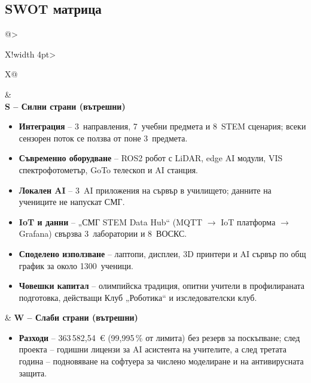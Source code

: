 \documentclass[11pt,a4paper]{article}
\renewcommand{\arraystretch}{1.15}
\newcommand{\NumTotal}{363\,582,54~€}
\newcommand{\PctUse}{99,995\,\%}
\begin{document}
\subsection{SWOT матрица}

\begingroup
\footnotesize
\setlength{\tabcolsep}{5pt}
\renewcommand{\arraystretch}{1.0}
\newcommand{\swothead}[2]{\textbf{\color{#1}#2}\par\vspace{1pt}}
\newenvironment{swotlist}{\begin{itemize}[leftmargin=1.0em, itemsep=1pt, topsep=0pt, partopsep=0pt, parsep=0pt, after=\vspace{-0.1\baselineskip}]}{\end{itemize}}
\noindent
\begin{tabularx}{\textwidth}{@{}>{\raggedright\arraybackslash}X!{\color{white}\vrule width 4pt}>{\raggedright\arraybackslash}X@{}}
 &
 \\
\noalign{\vskip 4pt}
%
\swothead{teal}{S – Силни страни (вътрешни)}
\begin{swotlist}
  \item \textbf{Интеграция} – 3~направления, 7~учебни предмета и 8~STEM сценария; всеки сензорен поток се ползва от поне 3~предмета.
  \item \textbf{Съвременно оборудване} – ROS2 робот с LiDAR, edge AI модули, VIS спектрофотометър, GoTo телескоп и AI станция.
  \item \textbf{Локален AI} – 3~AI приложения на сървър в училището; данните на учениците не напускат СМГ.
  \item \textbf{IoT и данни} – „СМГ STEM Data Hub“ (MQTT $\to$ IoT платформа $\to$ Grafana) свързва 3~лаборатории и 8~ВОСКС.
  \item \textbf{Споделено използване} – лаптопи, дисплеи, 3D принтери и AI сървър по общ график за около 1300~ученици.
  \item \textbf{Човешки капитал} – олимпийска традиция, опитни учители в профилираната подготовка, действащи Клуб „Роботика“ и изследователски клуб.
\end{swotlist}
&
%
\swothead{navy}{W – Слаби страни (вътрешни)}
\begin{swotlist}
  \item \textbf{Разходи} – \NumTotal{} (\PctUse{} от лимита) без резерв за поскъпване; след проекта – годишни лицензи за AI асистента на учителите, а след третата година – подновяване на софтуера за числено моделиране и на антивирусната защита.

\end{swotlist}
\end{tabularx}
\end{document}
